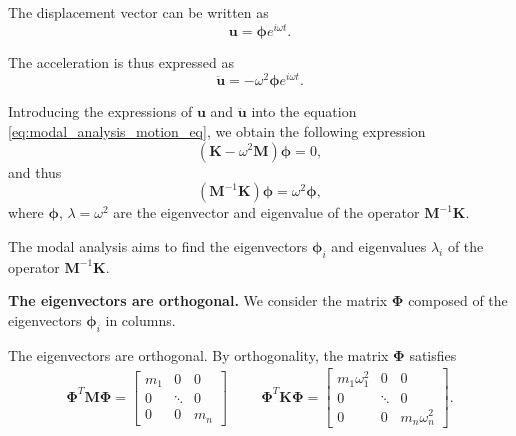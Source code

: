 \documentclass{article}
\begin{document}
The displacement vector can be written as
\begin{equation}
  \bm{u} = \bm{\phi} e^{i \omega t}.
\end{equation}

The acceleration is thus expressed as
\begin{equation}
  \bm{\ddot{u}} = -\omega^2 \bm{\phi} e^{i \omega t}.
\end{equation}

Introducing the expressions of $\bm{u}$ and $\bm{\ddot{u}}$ into the equation \ref{eq:modal_analysis_motion_eq}, we obtain the following expression
\begin{equation}
  (\bm{K} - \omega^2 \bm{M}) \bm{\phi} = 0,
\end{equation}
and thus
\begin{equation}
  (\bm{M}^{-1}\bm{K})\bm{\phi} = \omega^2 \bm{\phi},
\end{equation}
where $\bm{\phi}$, $\lambda = \omega^2$ are the eigenvector and eigenvalue of the operator $\bm{M}^{-1}\bm{K}$.\newline

The modal analysis aims to find the eigenvectors $\bm{\phi}_i$ and eigenvalues $\lambda_i$ of the operator $\bm{M}^{-1}\bm{K}$.\newline

\noindent \textbf{The eigenvectors are orthogonal.}\newline
\noindent We consider the matrix $\bm{\Phi}$ composed of the eigenvectors $\bm{\phi}_i$ in columns.\newline

The eigenvectors are orthogonal. By orthogonality, the matrix $\bm{\Phi}$ satisfies
\begin{align*}
  \bm{\Phi}^T \bm{M} \bm{\Phi} = \begin{bmatrix}
      m_1 & 0 & 0\\
      0 & \ddots & 0 \\
      0 & 0 & m_n
    \end{bmatrix}
    \hspace{1cm}
    \bm{\Phi}^T \bm{K} \bm{\Phi} = \begin{bmatrix}
      m_1 \omega_1^2 & 0 & 0\\
      0 & \ddots & 0 \\
      0 & 0 & m_n \omega_n^2
    \end{bmatrix}.
  \end{align*}
  
\end{document}
